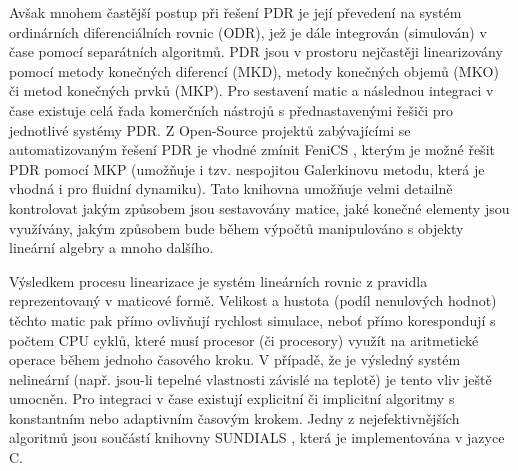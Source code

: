 Avšak mnohem častější postup při řešení PDR je její převedení na systém
ordinárních diferenciálních rovnic (ODR), jež je dále integrován (simulován) v
čase pomocí separátních algoritmů. PDR jsou v prostoru nejčastěji linearizovány
pomocí metody konečných diferencí (MKD), metody konečných objemů (MKO) či
metod konečných prvků (MKP). Pro sestavení matic a následnou integraci v čase
existuje celá řada komerčních nástrojů s přednastavenými řešiči pro jednotlivé
systémy PDR. Z Open-Source projektů zabývajícími se automatizovaným řešení PDR
je vhodné zmínit FeniCS \cite{AlnaesBlechta2015a}, kterým je možné řešit PDR
pomocí MKP (umožňuje i tzv. nespojitou Galerkinovu metodu, která je vhodná i
pro fluidní dynamiku). Tato knihovna umožňuje velmi detailně kontrolovat jakým
způsobem jsou sestavovány matice, jaké konečné elementy jsou využívány, jakým
způsobem bude během výpočtů manipulováno s objekty lineární algebry a mnoho
dalšího.

Výsledkem procesu linearizace je systém lineárních rovnic z pravidla
reprezentovaný v maticové formě. Velikost a hustota (podíl nenulových hodnot)
těchto matic pak přímo ovlivňují rychlost simulace, neboť přímo korespondují s
počtem CPU cyklů, které musí procesor (či procesory) využít na aritmetické
operace během jednoho časového kroku. V případě, že je výsledný systém
nelineární (např. jsou-li tepelné vlastnosti závislé na teplotě) je tento vliv
ještě umocněn. Pro integraci v čase existují explicitní či implicitní algoritmy
s konstantním nebo adaptivním časovým krokem. Jedny z nejefektivnějších
algoritmů jsou součástí knihovny SUNDIALS \cite{sundials}, která je
implementována v jazyce C.

